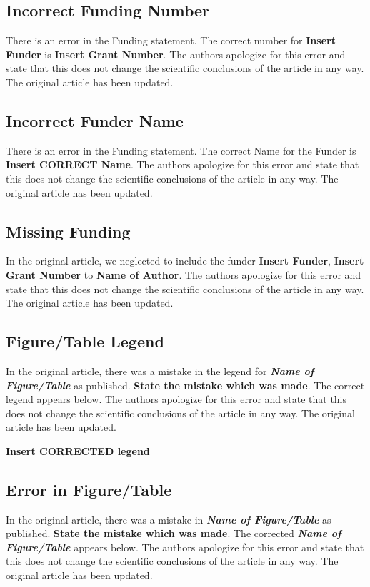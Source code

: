 \documentclass[utf8]{frontiers_correction}
\begin{document}
\subsection*{Incorrect Funding Number}
There is an error in the Funding statement. The correct number for \textbf{Insert Funder} is \textbf{Insert Grant Number}. The authors apologize for this error and state that this does not change the scientific conclusions of the article in any way. The original article has been updated.

\subsection*{Incorrect Funder Name}
There is an error in the Funding statement. The correct Name for the Funder is \textbf{Insert CORRECT Name}. The authors apologize for this error and state that this does not change the scientific conclusions of the article in any way. The original article has been updated.

\subsection*{Missing Funding}
In the original article, we neglected to include the funder \textbf{Insert Funder}, \textbf{Insert Grant Number} to \textbf{Name of Author}. The authors apologize for this error and state that this does not change the scientific conclusions of the article in any way. The original article has been updated.


\subsection*{Figure/Table Legend}
In the original article, there was a mistake in the legend for \textbf{\textit{Name of Figure/Table}} as published. \textbf{State the mistake which was made}. The correct legend appears below. The authors apologize for this error and state that this does not change the scientific conclusions of the article in any way. The original article has been updated.\par

\textbf{Insert CORRECTED legend}

\subsection*{Error in Figure/Table}
In the original article, there was a mistake in \textbf{\textit{Name of Figure/Table}} as published. \textbf{State the mistake which was made}. The corrected \textbf{\textit{Name of Figure/Table}} appears below. The authors apologize for this error and state that this does not change the scientific conclusions of the article in any way. The original article has been updated.\par
\end{document}
